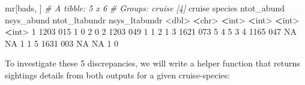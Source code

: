 \documentclass[
]{book}
\newenvironment{Shaded}{\begin{snugshade}}{\end{snugshade}}
\newcommand{\CommentTok}[1]{\textcolor[rgb]{0.56,0.35,0.01}{\textit{#1}}}
\newcommand{\ConstantTok}[1]{\textcolor[rgb]{0.00,0.00,0.00}{#1}}
\newcommand{\DecValTok}[1]{\textcolor[rgb]{0.00,0.00,0.81}{#1}}
\newcommand{\ErrorTok}[1]{\textcolor[rgb]{0.64,0.00,0.00}{\textbf{#1}}}
\newcommand{\NormalTok}[1]{#1}
\newcommand{\SpecialCharTok}[1]{\textcolor[rgb]{0.00,0.00,0.00}{#1}}
\begin{document}
\begin{Shaded}
\begin{Highlighting}[]
\NormalTok{mr[bads, ]}
\CommentTok{\# A tibble: 5 x 6}
\CommentTok{\# Groups:   cruise [4]}
\NormalTok{  cruise species ntot\_abund nsys\_abund ntot\_ltabundr nsys\_ltabundr}
   \SpecialCharTok{\textless{}}\NormalTok{dbl}\SpecialCharTok{\textgreater{}} \ErrorTok{\textless{}}\NormalTok{chr}\SpecialCharTok{\textgreater{}}        \ErrorTok{\textless{}}\NormalTok{int}\SpecialCharTok{\textgreater{}}      \ErrorTok{\textless{}}\NormalTok{int}\SpecialCharTok{\textgreater{}}         \ErrorTok{\textless{}}\NormalTok{int}\SpecialCharTok{\textgreater{}}         \ErrorTok{\textless{}}\NormalTok{int}\SpecialCharTok{\textgreater{}}
\DecValTok{1}   \DecValTok{1203} \DecValTok{015}              \DecValTok{1}          \DecValTok{0}             \DecValTok{2}             \DecValTok{0}
\DecValTok{2}   \DecValTok{1203} \DecValTok{049}              \DecValTok{1}          \DecValTok{1}             \DecValTok{2}             \DecValTok{1}
\DecValTok{3}   \DecValTok{1621} \DecValTok{073}              \DecValTok{5}          \DecValTok{4}             \DecValTok{5}             \DecValTok{3}
\DecValTok{4}   \DecValTok{1165} \DecValTok{047}             \ConstantTok{NA}         \ConstantTok{NA}             \DecValTok{1}             \DecValTok{1}
\DecValTok{5}   \DecValTok{1631} \DecValTok{003}             \ConstantTok{NA}         \ConstantTok{NA}             \DecValTok{1}             \DecValTok{0}
\end{Highlighting}
\end{Shaded}

To investigate these 5 discrepancies, we will write a helper function that returns sightings details from both outputs for a given cruise-species:
\end{document}
